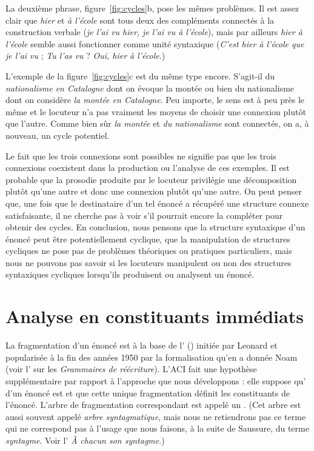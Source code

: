 {La deuxième phrase, figure~\ref{fig:cycles}b, pose les mêmes problèmes. Il est assez clair que \textit{hier} et \textit{à l’école} sont tous deux des compléments connectés à la construction verbale (\textit{je l’ai vu hier, je l’ai vu à l’école}), mais par ailleurs \textit{hier à l’école} semble aussi fonctionner comme unité syntaxique (\textit{C’est hier à l’école que je l’ai vu} ; \textit{Tu l’as vu} ? \textit{Oui, hier à l’école}.)

L'exemple  de la figure~\ref{fig:cycles}c est du même type encore. S’agit-il du \textit{nationalisme en Catalogne} dont on évoque la montée ou bien du nationalisme dont on considère \textit{la montée en Catalogne}. Peu importe, le sens est à peu près le même et le locuteur n’a pas vraiment les moyens de choisir une connexion plutôt que l’autre. Comme bien sûr \textit{la montée} et \textit{du nationalisme} sont connectés, on a, à nouveau, un cycle potentiel.

Le fait que les trois connexions sont possibles ne signifie pas que les trois connexions coexistent dans la production ou l’analyse de ces exemples. Il est probable que la prosodie produite par le locuteur privilégie une décomposition plutôt qu’une autre et donc une connexion plutôt qu’une autre. On peut penser que, une fois que le destinataire d’un tel énoncé a récupéré une structure connexe satisfaisante, il ne cherche pas à voir s’il pourrait encore la compléter pour obtenir des cycles. En conclusion, nous pensons que la structure syntaxique d’un énoncé peut être potentiellement cyclique, que la manipulation de structures cycliques ne pose pas de problèmes théoriques ou pratiques particuliers, mais nous ne pouvons pas savoir si les locuteurs manipulent ou non des structures syntaxiques cycliques lorsqu’ils produisent ou analysent un énoncé.
}
\section{Analyse en constituants immédiats}\label{sec:3.2.25}

La fragmentation d’un énoncé est à la base de l’ () initiée par Leonard \citet{bloomfield1933language} et popularisée à la fin des années 1950 par la formalisation qu’en a donnée Noam \citet{chomsky1957syntactic} (voir l’ sur les \textit{Grammaires de réécriture}). L’ACI fait une hypothèse supplémentaire par rapport à l’approche que nous développons : elle suppose qu’ d’un énoncé est  et que cette unique fragmentation définit les constituants de l’énoncé. L’arbre de fragmentation correspondant est appelé un . (Cet arbre est aussi souvent appelé \textit{arbre syntagmatique}, mais nous ne retiendrons pas ce terme qui ne correspond pas à l’usage que nous faisons, à la suite de Saussure, du terme \textit{syntagme}. Voir l’ \textit{À chacun son syntagme}.)

